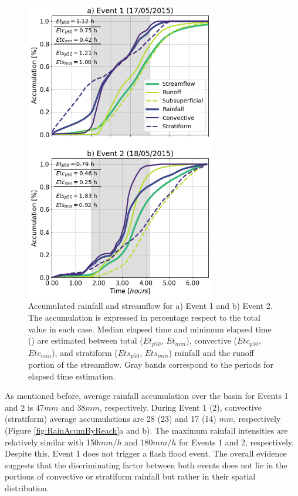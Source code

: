 \documentclass[hess, manuscript]{copernicus} %
\begin{document}
\begin{figure}[t]
\centering
 \includegraphics[width=8.3cm]{Figures/Rain_Streamflow_Elapsed.png}
 \caption{Accumulated rainfall and streamflow for a)  Event 1 and b) Event 2. The accumulation is expressed in percentage respect to the total value in each case. Median elapsed time and minimum elapsed time () are estimated between total ($Et_{p50}$, $Et_{min}$), convective ($Etc_{p50}$, $Etc_{min}$), and stratiform ($Ets_{p50}$, $Ets_{min}$) rainfall and the runoff portion of the streamflow.  Gray bands correspond to the periods for elapsed time estimation.}
    \label{fig:lluviaElapsedCaudal}
\end{figure}

As mentioned before, average rainfall accumulation over the basin for Events 1 and 2 is 47$mm$ and 38$mm$, respectively. During  Event 1 (2), convective (stratiform) average accumulations are 28 (23) and 17 (14) $mm$, respectively (Figure \ref{fig:RainAcumByReach}a and b).  The maximum rainfall intensities are relatively similar with 150$mm/h$ and 180$mm/h$ for Events 1 and 2, respectively.  Despite this, Event 1 does not trigger a flash flood event. The overall evidence suggests that the discriminating factor between both events does not lie in the portions of convective or stratiform rainfall but rather in their spatial distribution. \\
\end{document}
